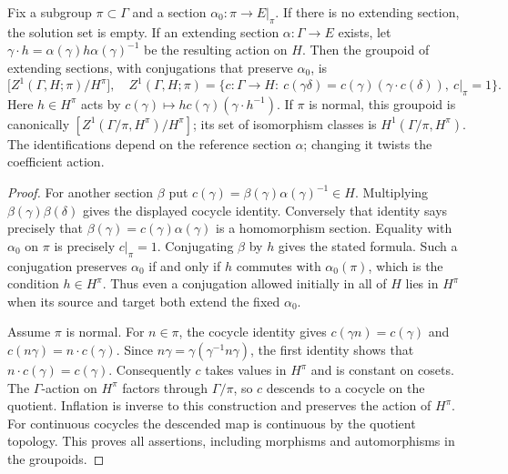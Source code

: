 \begin{theorem}\label{cat:J1}
Fix a subgroup $\pi\subset\Gamma$ and a section
$\alpha_0:\pi\to E|_\pi$.  If there is no extending section, the solution
set is empty.  If an extending section $\alpha:\Gamma\to E$ exists, let
$\gamma\cdot h=\alpha(\gamma)h\alpha(\gamma)^{-1}$ be the resulting action
on $H$.  Then the groupoid of extending sections, with conjugations that
preserve $\alpha_0$, is
\[
 \bigl[Z^1(\Gamma,H;\pi)/H^\pi\bigr],
 \quad
 Z^1(\Gamma,H;\pi)=
 \{c:\Gamma\to H:\ c(\gamma\delta)=c(\gamma)
       (\gamma\cdot c(\delta)),\ c|_\pi=1\}.
\]
Here $h\in H^\pi$ acts by
$c(\gamma)\mapsto h c(\gamma)(\gamma\cdot h^{-1})$.
If $\pi$ is normal, this groupoid is canonically
$[Z^1(\Gamma/\pi,H^\pi)/H^\pi]$; its set of isomorphism classes is
$H^1(\Gamma/\pi,H^\pi)$.  The identifications depend on the reference
section $\alpha$; changing it twists the coefficient action.
\end{theorem}
\begin{proof}
For another section $\beta$ put
$c(\gamma)=\beta(\gamma)\alpha(\gamma)^{-1}\in H$.
Multiplying $\beta(\gamma)\beta(\delta)$ gives the displayed cocycle
identity.  Conversely that identity says precisely that
$\beta(\gamma)=c(\gamma)\alpha(\gamma)$ is a homomorphism section.
Equality with $\alpha_0$ on $\pi$ is precisely $c|_\pi=1$.
Conjugating $\beta$ by $h$ gives the stated formula.  Such a conjugation
preserves $\alpha_0$ if and only if $h$ commutes with $\alpha_0(\pi)$,
which is the condition $h\in H^\pi$.  Thus even a conjugation allowed
initially in all of $H$ lies in $H^\pi$ when its source and target both
extend the fixed $\alpha_0$.

Assume $\pi$ is normal.  For $n\in\pi$, the cocycle identity gives
$c(\gamma n)=c(\gamma)$ and
$c(n\gamma)=n\cdot c(\gamma)$.  Since
$n\gamma=\gamma(\gamma^{-1}n\gamma)$, the first identity shows that
$n\cdot c(\gamma)=c(\gamma)$.  Consequently $c$ takes values in $H^\pi$
and is constant on cosets.  The $\Gamma$-action on $H^\pi$ factors
through $\Gamma/\pi$, so $c$ descends to a cocycle on the quotient.
Inflation is inverse to this construction and preserves the action of
$H^\pi$.  For continuous cocycles the descended map is continuous by
the quotient topology.  This proves all assertions, including morphisms
and automorphisms in the groupoids.
\end{proof}

